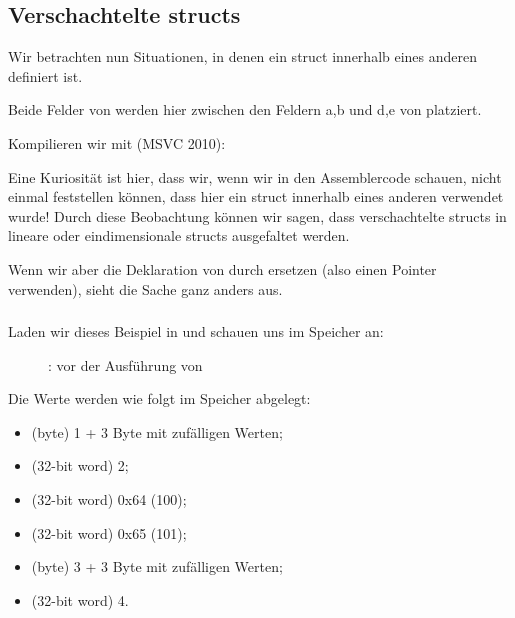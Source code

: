 \subsection{Verschachtelte structs}
Wir betrachten nun Situationen, in denen ein struct innerhalb eines anderen definiert ist.


Beide Felder von  werden hier zwischen den Feldern a,b und d,e von  platziert.

Kompilieren wir mit (MSVC 2010):



Eine Kuriosität ist hier, dass wir, wenn wir in den Assemblercode schauen, nicht einmal feststellen können, dass hier
ein struct innerhalb eines anderen verwendet wurde! Durch diese Beobachtung können wir sagen, dass verschachtelte
structs in lineare oder eindimensionale structs ausgefaltet werden.

Wenn wir aber die Deklaration von  durch  ersetzen (also einen
Pointer verwenden), sieht die Sache ganz anders aus.

\clearpage
\subsubsection{\olly}
\myindex{\olly}
Laden wir dieses Beispiel in \olly und schauen uns  im Speicher an:

\begin{figure}[H]
\centering
{}
\caption{\olly: vor der Ausführung von \printf}
\label{fig:nested_olly}
\end{figure}
Die Werte werden wie folgt im Speicher abgelegt:
\begin{itemize}
\item {} (byte) 1 + 3 Byte mit zufälligen Werten;
\item {} (32-bit word) 2;
\item {} (32-bit word) 0x64 (100);
\item {} (32-bit word) 0x65 (101);
\item {} (byte) 3 + 3 Byte mit zufälligen Werten;
\item {} (32-bit word) 4.
\end{itemize}

